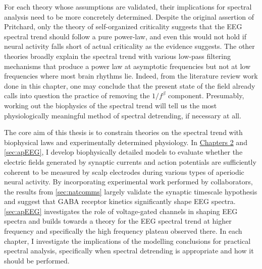 For each theory whose assumptions are validated, their implications for spectral analysis need to be more concretely determined. Despite the original assertion of Pritchard, only the theory of self-organized criticality suggests that the EEG spectral trend should follow a pure power-law, and even this would not hold if neural activity falls short of actual criticality as the evidence suggests. The other theories broadly explain the spectral trend with various low-pass filtering mechanisms that produce a power law at asymptotic frequencies but not at low frequencies where most brain rhythms lie. Indeed, from the literature review work done in this chapter, one may conclude that the present state of the field already calls into question the practice of removing the $1/f^\beta$ component. Presumably, working out the biophysics of the spectral trend will tell us the most physiologically meaningful method of spectral detrending, if necessary at all.

The core aim of this thesis is to constrain theories on the spectral trend with biophysical laws and experimentally determined physiology. In \hyperref[sec:natcomms]{Chapters 2} and \ref{sec:apEEG}, I develop biophysically detailed models to evaluate whether the electric fields generated by synaptic currents and action potentials are sufficiently coherent to be measured by scalp electrodes during various types of aperiodic neural activity. By incorporating experimental work performed by collaborators, the results from \autoref{sec:natcomms} largely validate the synaptic timescale hypothesis and suggest that GABA receptor kinetics significantly shape EEG spectra. \autoref{sec:apEEG} investigates the role of voltage-gated channels in shaping EEG spectra and builds towards a theory for the EEG spectral trend at higher frequency and specifically the high frequency plateau observed there. In each chapter, I investigate the implications of the modelling conclusions for practical spectral analysis, specifically when spectral detrending is appropriate and how it should be performed.